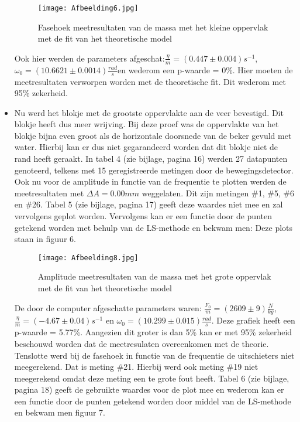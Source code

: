 \documentclass[12pt,a4]{article}
\begin{document}
\begin{itemize}
\begin{figure}[h]
\centering
\texttt{[image: Afbeelding6.jpg]}
\caption{Fasehoek meetresultaten van de massa met het kleine oppervlak met de fit van het theoretische model}
\end{figure}

Ook hier werden de parameters afgeschat:$\frac{\eta}{m} = (0.447 \pm 0.004)s^{-1}$, $\omega_0 = (10.6621 \pm 0.0014)\frac{rad}{s}$en wederom een p-waarde = 0\%. Hier moeten de meetresultaten verworpen worden met de theoretische fit. Dit wederom met 95\% zekerheid.

\item Nu werd het blokje met de grootste oppervlakte aan de veer bevestigd. Dit blokje heeft dus meer wrijving. Bij deze proef was de oppervlakte van het blokje bijna even groot als de horizontale doorsnede van de beker gevuld met water. Hierbij kan er dus niet gegarandeerd worden dat dit blokje niet de rand heeft geraakt. In tabel 4 (zie bijlage, pagina 16) werden 27 datapunten genoteerd, telkens met 15 geregistreerde metingen door de bewegingsdetector.\\

Ook nu voor de amplitude in functie van de frequentie te plotten werden de meetresultaten met $\Delta A = 0.00mm$ weggelaten. Dit zijn metingen \#1, \#5, \#6 en \#26. Tabel 5 (zie bijlage, pagina 17) geeft deze waardes niet mee en zal vervolgens geplot worden. Vervolgens kan er een functie door de punten getekend worden met behulp van de LS-methode en bekwam men: Deze plots staan in figuur 6.

\begin{figure}[h]
\centering
\texttt{[image: Afbeelding8.jpg]}
\caption{Amplitude meetresultaten van de massa met het grote oppervlak met de fit van het theoretische model}
\end{figure}

De door de computer afgeschatte parameters waren:
$\frac{F_0}{m} = (2609 \pm 9)\frac{N}{kg}$, $\frac{\eta}{m} = (-4.67 \pm 0.04)s^{-1}$ en $\omega_0 = (10.299 \pm 0.015)\frac{rad}{s}$. Deze grafiek heeft een p-waarde = 5.77\%. Aangezien dit groter is dan 5\% kan er met 95\% zekerheid beschouwd worden dat de meetresulaten overeenkomen met de theorie.\\

Tenslotte werd bij de fasehoek in functie van de frequentie de uitschieters niet meegerekend. Dat is meting \#21. Hierbij werd ook meting \#19 niet meegerekend omdat deze meting een te grote fout heeft. Tabel 6 (zie bijlage, pagina 18) geeft de gebruikte waardes voor de plot mee en wederom kan er een functie door de punten getekend worden door middel van de LS-methode en bekwam men figuur 7.\\


\end{itemize}
\end{document}
